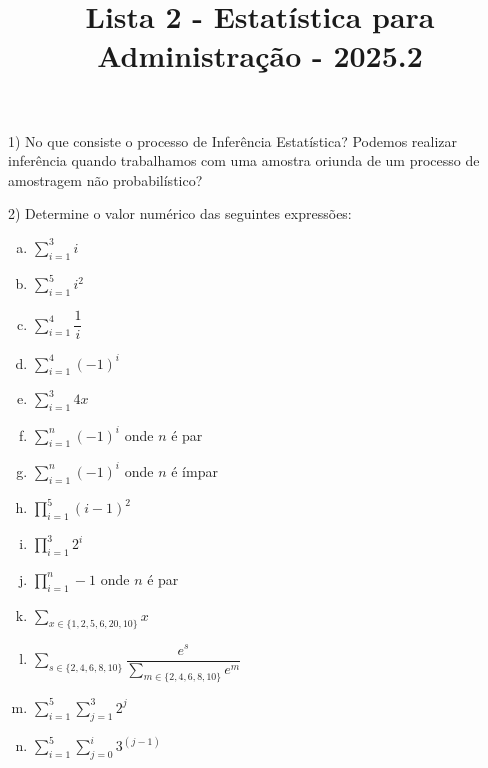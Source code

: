 \documentclass[12pt]{article}
\title{Lista 2 - Estatística para Administração - 2025.2}
\begin{document}
\date{}
\maketitle

1) No que consiste o processo de Inferência Estatística? Podemos realizar inferência quando trabalhamos com uma amostra oriunda de um processo de amostragem não probabilístico?
\vspace{5px}

2) Determine o valor numérico das seguintes expressões:

\begin{enumerate}[a)] %
    \item $\sum\limits_{i = 1}^3 i$ \\
    \item $\sum\limits_{i = 1}^5 i^2$ \\
    \item $\sum\limits_{i = 1}^4 \dfrac{1}{i}$ \\
    \item $\sum\limits_{i = 1}^4 (-1)^{i}$ \\
    \item $\sum\limits_{i = 1}^3 4x$ \\
    \item $\sum\limits_{i = 1}^n (-1)^{i}$ onde $n$ é par\\
    \item $\sum\limits_{i = 1}^n (-1)^{i}$ onde $n$ é ímpar\\
    \item $\prod\limits_{i=1}^5 (i-1)^2$\\
    \item $\prod\limits_{i=1}^3 2^i$\\
    \item $\prod\limits_{i=1}^n -1$ onde $n$ é par\\
    \item $\sum\limits_{x \in \{ 1, 2,5,6,20,10\}} x $ \\ 
    \item $\sum\limits_{s \in \{ 2,4,6,8,10\}}  \dfrac{e^s}{\sum\limits_{m \in \{ 2,4,6,8,10\}} e^m} $ \\
    \item $\sum\limits_{i=1}^5\sum\limits_{j=1}^3 2^j$
    \item $\sum\limits_{i=1}^5\sum\limits_{j=0}^i 3^{(j-1)}$
\end{enumerate}
\vspace{5px}
\end{document}
